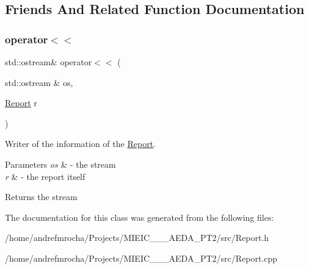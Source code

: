 \subsection{Friends And Related Function Documentation}
\mbox{\label{class_report_a9c2eaa693abfadab4a6e151daee874e4}} 
\subsubsection{\texorpdfstring{operator$<$$<$}{operator<<}}
{\footnotesize\ttfamily std\+::ostream\& operator$<$$<$ (\begin{DoxyParamCaption}\item[{std\+::ostream \&}]{os,  }\item[{\mbox{\hyperlink{class_report}{Report}}}]{r }\end{DoxyParamCaption})\hspace{0.3cm}{\ttfamily [friend]}}



Writer of the information of the \mbox{\hyperlink{class_report}{Report}}. 


\begin{DoxyParams}{Parameters}
{\em os} & -\/ the stream \\
\hline
{\em r} & -\/ the report itself \\
\hline
\end{DoxyParams}
\begin{DoxyReturn}{Returns}
the stream 
\end{DoxyReturn}


The documentation for this class was generated from the following files\+:\begin{DoxyCompactItemize}
\item 
/home/andrefmrocha/\+Projects/\+M\+I\+E\+I\+C\+\_\+\_\+\_\+\+A\+E\+D\+A\+\_\+\+P\+T2/src/Report.\+h\item 
/home/andrefmrocha/\+Projects/\+M\+I\+E\+I\+C\+\_\+\_\+\_\+\+A\+E\+D\+A\+\_\+\+P\+T2/src/Report.\+cpp\end{DoxyCompactItemize}
